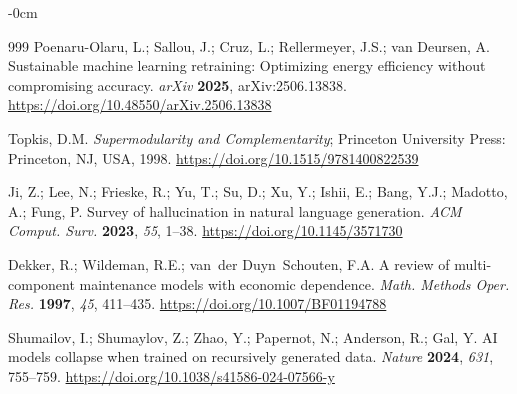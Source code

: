 \documentclass[electronics,article,submit,pdftex,moreauthors]{Definitions/mdpi}
\begin{document}
\begin{adjustwidth}{-\extralength}{0cm}
\begin{thebibliography}{999}
Poenaru-Olaru, L.; Sallou, J.; Cruz, L.; Rellermeyer, J.S.; van Deursen, A. Sustainable machine learning retraining: Optimizing energy efficiency without compromising accuracy. {\em arXiv} {\bf 2025}, arXiv:2506.13838. \url{https://doi.org/10.48550/arXiv.2506.13838}

Topkis, D.M. {\em Supermodularity and Complementarity}; Princeton University Press: Princeton, NJ, USA, 1998. \url{https://doi.org/10.1515/9781400822539}

Ji, Z.; Lee, N.; Frieske, R.; Yu, T.; Su, D.; Xu, Y.; Ishii, E.; Bang, Y.J.; Madotto, A.; Fung, P. Survey of hallucination in natural language generation. {\em ACM Comput. Surv.} {\bf 2023}, {\em 55}, 1--38. \url{https://doi.org/10.1145/3571730}

Dekker, R.; Wildeman, R.E.; van~der Duyn~Schouten, F.A. A review of multi-component maintenance models with economic dependence. {\em Math. Methods Oper. Res.} {\bf 1997}, {\em 45}, 411--435. \url{https://doi.org/10.1007/BF01194788}

Shumailov, I.; Shumaylov, Z.; Zhao, Y.; Papernot, N.; Anderson, R.; Gal, Y. AI models collapse when trained on recursively generated data. {\em Nature} {\bf 2024}, {\em 631}, 755--759. \url{https://doi.org/10.1038/s41586-024-07566-y}

\end{thebibliography}

\PublishersNote{}
\end{adjustwidth}
\end{document}
